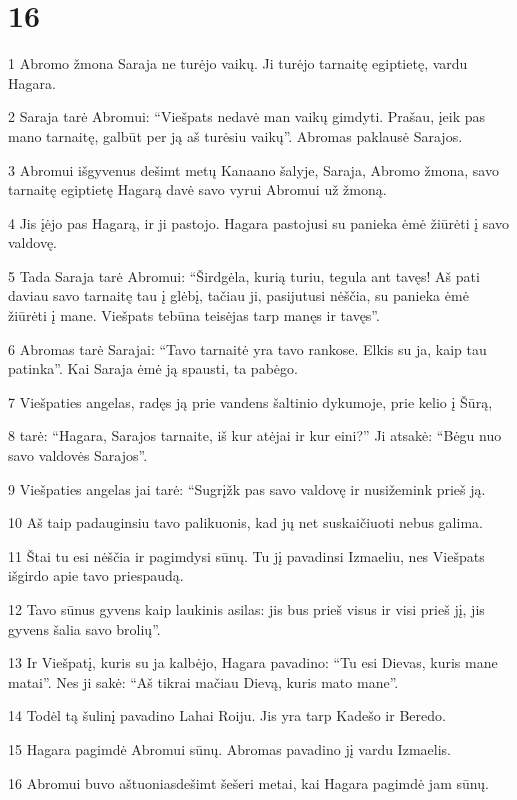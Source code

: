 \chapter{16}


\par 1 Abromo žmona Saraja ne turėjo vaikų. Ji turėjo tarnaitę egiptietę, vardu Hagara. 
\par 2 Saraja tarė Abromui: “Viešpats nedavė man vaikų gimdyti. Prašau, įeik pas mano tarnaitę, galbūt per ją aš turėsiu vaikų”. Abromas paklausė Sarajos. 
\par 3 Abromui išgyvenus dešimt metų Kanaano šalyje, Saraja, Abromo žmona, savo tarnaitę egiptietę Hagarą davė savo vyrui Abromui už žmoną. 
\par 4 Jis įėjo pas Hagarą, ir ji pastojo. Hagara pastojusi su panieka ėmė žiūrėti į savo valdovę. 
\par 5 Tada Saraja tarė Abromui: “Širdgėla, kurią turiu, tegula ant tavęs! Aš pati daviau savo tarnaitę tau į glėbį, tačiau ji, pasijutusi nėščia, su panieka ėmė žiūrėti į mane. Viešpats tebūna teisėjas tarp manęs ir tavęs”. 
\par 6 Abromas tarė Sarajai: “Tavo tarnaitė yra tavo rankose. Elkis su ja, kaip tau patinka”. Kai Saraja ėmė ją spausti, ta pabėgo. 
\par 7 Viešpaties angelas, radęs ją prie vandens šaltinio dykumoje, prie kelio į Šūrą, 
\par 8 tarė: “Hagara, Sarajos tarnaite, iš kur atėjai ir kur eini?” Ji atsakė: “Bėgu nuo savo valdovės Sarajos”. 
\par 9 Viešpaties angelas jai tarė: “Sugrįžk pas savo valdovę ir nusižemink prieš ją. 
\par 10 Aš taip padauginsiu tavo palikuonis, kad jų net suskaičiuoti nebus galima. 
\par 11 Štai tu esi nėščia ir pagimdysi sūnų. Tu jį pavadinsi Izmaeliu, nes Viešpats išgirdo apie tavo priespaudą. 
\par 12 Tavo sūnus gyvens kaip laukinis asilas: jis bus prieš visus ir visi prieš jį, jis gyvens šalia savo brolių”. 
\par 13 Ir Viešpatį, kuris su ja kalbėjo, Hagara pavadino: “Tu esi Dievas, kuris mane matai”. Nes ji sakė: “Aš tikrai mačiau Dievą, kuris mato mane”. 
\par 14 Todėl tą šulinį pavadino Lahai Roiju. Jis yra tarp Kadešo ir Beredo. 
\par 15 Hagara pagimdė Abromui sūnų. Abromas pavadino jį vardu Izmaelis. 
\par 16 Abromui buvo aštuoniasdešimt šešeri metai, kai Hagara pagimdė jam sūnų.




